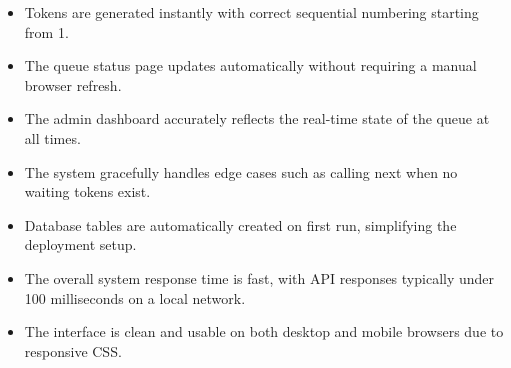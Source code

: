 \begin{itemize}
    \item Tokens are generated instantly with correct sequential numbering starting from 1.
    \item The queue status page updates automatically without requiring a manual browser refresh.
    \item The admin dashboard accurately reflects the real-time state of the queue at all times.
    \item The system gracefully handles edge cases such as calling next when no waiting tokens exist.
    \item Database tables are automatically created on first run, simplifying the deployment setup.
    \item The overall system response time is fast, with API responses typically under 100 milliseconds on a local network.
    \item The interface is clean and usable on both desktop and mobile browsers due to responsive CSS.
\end{itemize}
